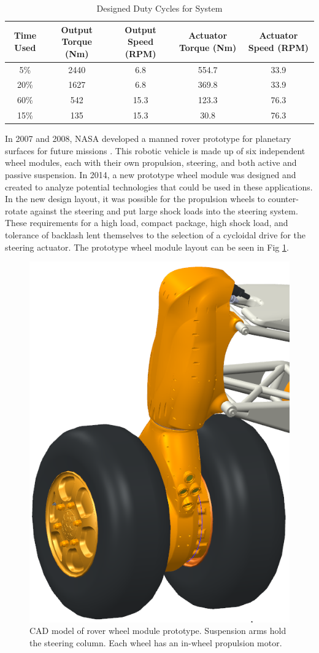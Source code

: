 \begin{table}[t]
\caption{Designed Duty Cycles for System}
\label{duty_cycle}
\begin{center}
\begin{tabular}{|c||c||c| |c| |c|}
\hline
Time Used & Output Torque (Nm) & Output Speed (RPM) & Actuator Torque (Nm) & Actuator Speed (RPM)\\
\hline
5\% & 2440 & 6.8 & 554.7 & 33.9\\
\hline
20\% & 1627 & 6.8 & 369.8 & 33.9\\
\hline
60\% & 542 & 15.3 & 123.3 & 76.3\\
\hline
15\% & 135 & 15.3 & 30.8 & 76.3\\
\hline
\end{tabular}
\end{center}
\end{table}

In 2007 and 2008, NASA developed a manned rover prototype for planetary surfaces for future missions \cite{rover}.
This robotic vehicle is made up of six independent wheel modules, each with their own propulsion, steering, and both active and passive suspension.
In 2014, a new prototype wheel module was designed and created to analyze potential technologies that could be used in these applications.
In the new design layout, it was possible for the propulsion wheels to counter-rotate against the steering and put large shock loads into the steering system.
These requirements for a high load, compact package, high shock load, and tolerance of backlash lent themselves to the selection of a cycloidal drive for the steering actuator.
The prototype wheel module layout can be seen in Fig \ref{wheel_module}.

\begin{figure}[t]
   \centering
   \includegraphics[width=0.50\linewidth]{images/wheel_module_CAD}
   \caption{CAD model of rover wheel module prototype.
   Suspension arms hold the steering column.
   Each wheel has an in-wheel propulsion motor.}
   \label{wheel_module}
\end{figure}

